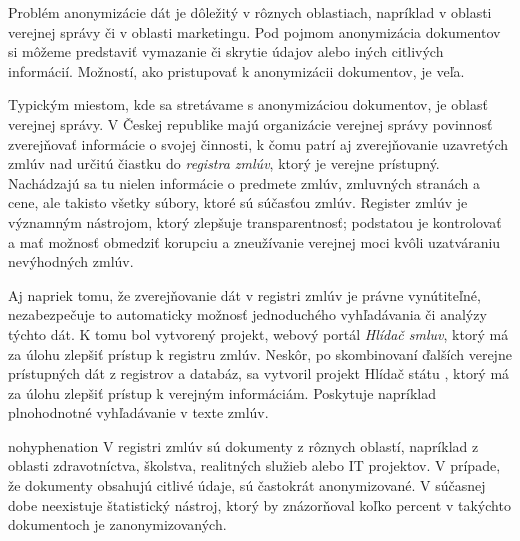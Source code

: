 \label{chap:intro}
Problém anonymizácie dát je dôležitý v rôznych oblastiach, napríklad v oblasti verejnej správy či
v oblasti marketingu. Pod pojmom anonymizácia dokumentov si môžeme predstaviť vymazanie či skrytie údajov 
alebo iných citlivých informácií. Možností, ako pristupovať k anonymizácii dokumentov, je veľa. 
\newline

Typickým miestom, kde sa stretávame s anonymizáciou dokumentov, je oblasť verejnej správy.
V Českej republike majú organizácie verejnej správy povinnosť zverejňovať informácie o svojej činnosti,
k čomu patrí aj zverejňovanie uzavretých zmlúv nad určitú čiastku do \textit{registra zmlúv}, 
ktorý je verejne prístupný. Nachádzajú sa tu nielen informácie o predmete zmlúv, zmluvných stranách a cene,
ale takisto všetky súbory, ktoré sú súčasťou zmlúv. Register zmlúv je významným nástrojom, ktorý zlepšuje 
transparentnosť; podstatou je kontrolovať a mať možnosť obmedziť korupciu a zneužívanie verejnej moci 
kvôli uzatváraniu nevýhodných zmlúv.
\newline

Aj napriek tomu, že zverejňovanie dát v registri zmlúv je právne vynútiteľné, nezabezpečuje to automaticky
možnosť jednoduchého vyhľadávania či analýzy týchto dát. K tomu bol vytvorený projekt, webový portál 
\textit{Hlídač smluv}, ktorý má za úlohu zlepšiť prístup k registru zmlúv. Neskôr, po skombinovaní ďalších 
verejne prístupných dát z registrov a databáz, sa vytvoril projekt Hlídač státu \cite{HlidacStatu}, ktorý má za úlohu zlepšiť prístup k verejným informáciám. Poskytuje
napríklad plnohodnotné vyhľadávanie v texte zmlúv.
\newline


\begin{hyphenrules}{nohyphenation}
V registri zmlúv sú dokumenty z rôznych oblastí, napríklad z oblasti zdravotníctva, školstva, realitných služieb alebo
IT projektov. V prípade, že dokumenty obsahujú citlivé údaje, sú častokrát anonymizované. V súčasnej dobe neexistuje 
štatistický nástroj, ktorý by znázorňoval koľko percent v takýchto dokumentoch je zanonymizovaných.
\end{hyphenrules}

\newpage

